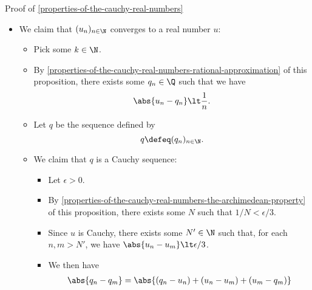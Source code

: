 \begin{Proof}{Proof of \cref{properties-of-the-cauchy-real-numbers}}
\begin{itemize}
\begin{itemize}
                \item This then gives
                    \begin{align*}
                        u_{n_{k}}-u_{n_{1}} &\gt k\epsilon\\%
                                            &\gt \epsilon'%
                    \end{align*}
                    for each $\epsilon'\gt0$, showing the sequence $(u_{n_{k}})_{k\in\N}$ to be unbounded.
                \item Since $(u_{n_{k}})_{k\in\N}$ is a subsequence of $(u_{n})_{n\in\N}$, this is a contradiction.
                \item Thus $(u_{n})_{n\in\N}$ is a Cauchy sequence.
            \end{itemize}
        \item We claim that $(u_{n})_{n\in\N}$ converges to a real number $u$:
            \begin{itemize}
                \item Pick some $k\in\N$.
                \item By \cref{properties-of-the-cauchy-real-numbers-rational-approximation} of this proposition, there exists some $q_{n}\in\Q$ such that we have
                    \[
                        \abs{u_{n}-q_{n}}%
                        \lt%
                        \frac{1}{n}.%
                    \]%
                \item Let $q$ be the sequence defined by
                    \[
                        q%
                        \defeq%
                        (q_{n})_{n\in\N}.%
                    \]%
                \item We claim that $q$ is a Cauchy sequence:
                    \begin{itemize}
                        \item Let $\epsilon\gt0$.
                        \item By \cref{properties-of-the-cauchy-real-numbers-the-archimedean-property} of this proposition, there exists some $N$ such that $1/N\lt\epsilon/3$.
                        \item Since $u$ is Cauchy, there exists some $N'\in\N$ such that, for each $n,m\gt N'$, we have $\abs{u_{n}-u_{m}}\lt\epsilon/3$.
                        \item We then have
                            \begin{align*}
                                \abs{q_{n}-q_{m}} &=     \abs{(q_{n}-u_{n})+(u_{n}-u_{m})+(u_{m}-q_{m})}\\

\end{align*}
\end{itemize}
\end{itemize}
\end{itemize}
\end{Proof}
